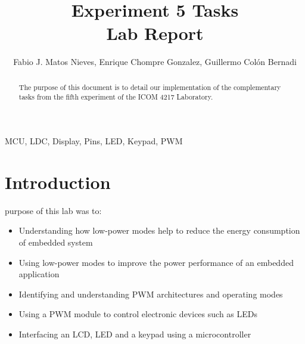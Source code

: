 \documentclass[journal]{IEEEtran}
\begin{document}
\title{Experiment 5 Tasks\\ Lab Report} \author{Fabio J. Matos
  Nieves, Enrique Chompre Gonzalez, Guillermo Colón Bernadi}
\maketitle
\begin{abstract}
  The purpose of this document is to detail our implementation of the
  complementary tasks from the fifth experiment of the ICOM 4217 Laboratory.
\end{abstract}
\begin{IEEEkeywords}
  MCU, LDC, Display, Pins, LED, Keypad, PWM
\end{IEEEkeywords}
\IEEEpeerreviewmaketitle
\section{Introduction}
 purpose of this lab was to:\\
\begin{itemize}
  \item Understanding how low-power modes help to reduce the energy consumption of embedded system
  \item Using low-power modes to improve the power performance of an embedded application
  \item Identifying and understanding PWM architectures and operating modes
  \item Using a PWM module to control electronic devices such as LEDs
  \item Interfacing an LCD, LED and a keypad using a microcontroller
\end{itemize}
\end{document}
